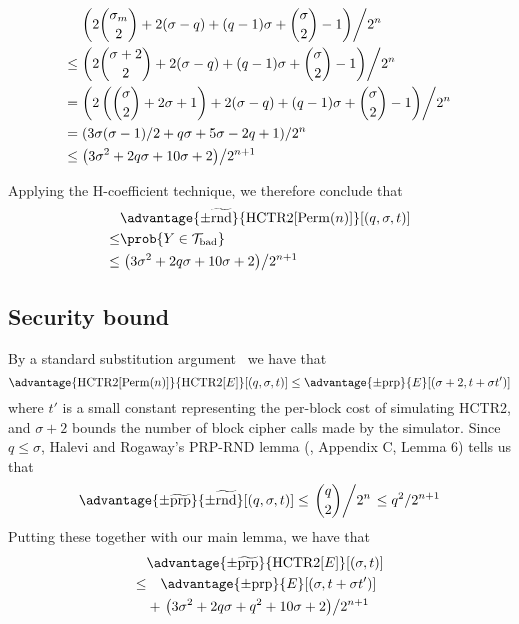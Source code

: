 \documentclass[letterpaper,11pt]{article}
\newcommand*{\Tb}{\mathcal{T}_\mathrm{bad}}
\DeclareMathOperator{\HCTR}{HCTR2}
\DeclareMathOperator{\Perm}{Perm}
\begin{document}
\begin{align*}
    & \left.\left(2\binom{\sigma_m}{2} + 2(\sigma - q) + (q-1)\sigma + \binom{\sigma}{2} -1\right)\middle/2^n\right. \\
    \leq & \left.\left(2\binom{\sigma + 2}{2} + 2(\sigma - q) + (q-1)\sigma + \binom{\sigma}{2} -1\right)\middle/2^n\right. \\
    = & \left.\left(2\left(\binom{\sigma}{2} + 2\sigma + 1\right) + 2(\sigma - q) + (q-1)\sigma + \binom{\sigma}{2} -1\right)\middle/2^n\right. \\
    = & \left.\left(3\sigma(\sigma - 1)/2 + q\sigma + 5\sigma - 2q + 1\right)\middle/2^n\right. \\
    \leq & \left.\left(3\sigma^2 + 2q\sigma + 10\sigma + 2\right)\middle/2^{n+1}\right. \\
\end{align*}

Applying the H-coefficient technique, we therefore conclude that
\begin{align*}
    & \advantage{\pm\widetilde{\mathrm{rnd}}}{\HCTR[\Perm(n)]}[(q, \sigma, t)] \\
    \leq & \prob{Y \in \Tb} \\
    \leq & \left.\left(3\sigma^2 + 2q\sigma + 10\sigma + 2\right)\middle/2^{n+1}\right.
\end{align*}

\subsection{Security bound}
By a standard substitution argument~\cite{cbcsec,concrete} we have that
\begin{displaymath}
    \advantage{\HCTR[\Perm(n)]}{\HCTR[E]}[(q, \sigma, t)]
    \leq \advantage{\pm \mathrm{prp}}{E}[(\sigma + 2, t + \sigma t')]
\end{displaymath}
where \(t'\) is a small constant
representing the per-block cost of simulating HCTR2, and
\(\sigma + 2\) bounds the number of block cipher calls made by the simulator.
Since \(q \leq \sigma\), Halevi and Rogaway's PRP-RND lemma
(\cite{cmc}, Appendix C, Lemma 6) tells us that
\begin{displaymath}
    \advantage{\pm \widetilde{\mathrm{prp}}}{\pm\widetilde{\mathrm{rnd}}}[(q, \sigma, t)] 
    \leq \left.\binom{q}{2}\middle/2^n\right.
    \leq q^2/2^{n+1}
\end{displaymath}
Putting these together with our main lemma, we have that
\begin{align*}
    &\advantage{\pm \widetilde{\mathrm{prp}}}{\HCTR[E]}[(\sigma, t)] \\
    \leq & \quad \advantage{\pm \mathrm{prp}}{E}[(\sigma, t + \sigma t')] \\
    &+ \left.\left(3\sigma^2 + 2q\sigma + q^2 + 10\sigma + 2\right)\middle/2^{n+1}\right. \\
\end{align*}
\end{document}
